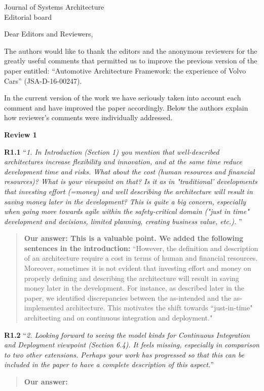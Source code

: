 \documentclass[a4paper,10pt]{letter}
\newcommand{\review}[1]{\hrulefill\par{\Large\textbf{Review #1}}}
\begin{document}
\begin{letter}{Journal of Systems Architecture\\
    Editorial board}

\opening{Dear Editors and Reviewers,}

The authors would like to thank the editors and the anonymous reviewers for the greatly useful comments that permitted us to improve the previous version of the paper entitled: ``Automotive Architecture Framework: the experience of Volvo Cars'' (JSA-D-16-00247). 

In the current version of the work we have seriously taken into account each comment and have improved the paper accordingly. Below the authors explain how reviewer's comments were individually addressed.


\review{1}
%

\textbf{R1.1} ``\textit{1. In Introduction (Section 1) you mention that well-described architectures increase flexibility and innovation, and at the same time reduce development time and risks. What about the cost (human resources and financial resources)? What is your viewpoint on that? Is it as in "traditional' developments that investing effort (=money) and well describing the architecture will result in saving money later in the development? This is quite a big concern, especially when going more towards agile within the safety-critical domain ("just in time" development and decisions, limited planning, creating business value, etc.). }''
\begin{quote}
\textbf{Our answer: This is a valuable point. We added the following sentences in the introduction:}
``However, the definition and description of an architecture require a cost in terms of human and financial resources. Moreover, sometimes it is not evident that investing effort and money on properly defining and describing the architecture will result in saving money later in the development. For instance, as described later in the paper, we identified discrepancies between the as-intended and the as-implemented architecture. This motivates the shift towards ``just-in-time" architecting and on continuous integration and deployment."
\end{quote}

\textbf{R1.2} ``\textit{2. Looking forward to seeing the model kinds for Continuous Integration and Deployment viewpoint (Section 6.4). It feels missing, especially in comparison to two other extensions. Perhaps your work has progressed so that this can be included in the paper to have a complete description of this aspect.}''
\begin{quote}
\textbf{Our answer: } 
\end{quote}


\end{letter}
\end{document}
